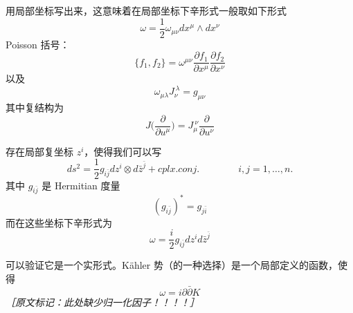 用局部坐标写出来，这意味着在局部坐标下辛形式一般取如下形式
\begin{equation}
  \omega=\frac{1}{2}\omega_{\mu\nu}dx^\mu\wedge dx^\nu
  \tag{B.9}
  \label{eq:B.9}
\end{equation}
Poisson 括号：
\begin{equation}
  \{f_1,f_2\}=\omega^{\mu\nu}\frac{\partial f_1}{\partial x^\mu}\frac{\partial f_2}{\partial x^\nu}
  \tag{B.10}
  \label{eq:B.10}
\end{equation}
以及
\begin{equation}
  \omega_{\mu\lambda}J_\nu^{\ \lambda}=g_{\mu\nu}
  \tag{B.11}
  \label{eq:B.11}
\end{equation}
其中复结构为
\begin{equation}
  J\Big(\frac{\partial}{\partial u^\mu}\Big)=J_\mu^{\ \nu}\frac{\partial}{\partial u^\nu}
  \tag{B.12}
  \label{eq:B.12}
\end{equation}

存在局部复坐标 $z^i$，使得我们可以写
\begin{equation}
  ds^2=\frac{1}{2}g_{i\bar j}dz^i\otimes d\bar z^{\bar j}+cplx.conj.\qquad\qquad i,j=1,\dots,n.
  \tag{B.13}
  \label{eq:B.13}
\end{equation}
其中 $g_{i\bar j}$ 是 Hermitian 度量
\begin{equation}
  (g_{i\bar j})^*=g_{j\bar i}
  \tag{B.14}
  \label{eq:B.14}
\end{equation}
而在这些坐标下辛形式为
\begin{equation}
  \omega=\frac{i}{2}g_{i\bar j}dz^id\bar z^{\bar j}
  \tag{B.15}
  \label{eq:B.15}
\end{equation}

可以验证它是一个实形式。Kähler 势（的一种选择）是一个局部定义的函数，使得
\begin{equation}
  \omega=i\partial\bar\partial K
  \tag{B.16}
  \label{eq:B.16}
\end{equation}
{\small\itshape ［原文标记：此处缺少归一化因子！！！！］}

